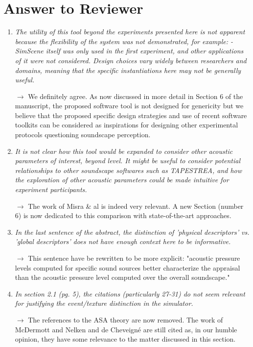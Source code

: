 \documentclass[10pt]{article}
\begin{document}
\section{Answer to Reviewer}

\begin{enumerate}

\item \emph{The utility of this tool beyond the experiments presented here is not apparent because the flexibility of the system was not demonstrated, for example:
- SimScene itself was only used in the first experiment, and other applications of it were not considered. Design choices vary widely between researchers and domains, meaning that the specific instantiations here may not be generally useful.}

$\rightarrow$ We definitely agree. As now discussed in more detail in Section 6 of the manuscript, the proposed software tool is not designed for genericity but we believe that the proposed specific design strategies and use of recent software toolkits can be considered as inspirations for designing other experimental protocols questioning soundscape perception.

\item \emph{It is not clear how this tool would be expanded to consider other acoustic parameters of interest, beyond level. It might be useful to consider potential relationships to other soundscape softwares such as TAPESTREA, and how the exploration of other acoustic parameters could be made intuitive for experiment participants.}

$\rightarrow$ The work of Misra \& al is indeed very relevant. A new Section (number 6) is now dedicated to this comparison with state-of-the-art approaches.

\item \emph{In the last sentence of the abstract, the distinction of 'physical descriptors' vs. 'global descriptors'  does not have enough context here to be informative.}

$\rightarrow$ This sentence have be rewritten to be more explicit: "acoustic pressure levels computed for specific sound sources better characterize the appraisal than the acoustic pressure level computed over the overall soundscape."

\item \emph{In section 2.1 (pg. 5), the citations (particularly 27-31) do not seem relevant for justifying the event/texture distinction in the simulator.}

$\rightarrow$ The references to the ASA theory are now removed. The work of McDermott and Nelken and de Cheveigné are still cited as, in our humble opinion, they have some relevance to the matter discussed in this section.

\end{enumerate}
\end{document}
